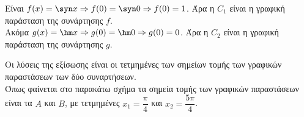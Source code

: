 \begin{alist}
\item Είναι $f(x) = \syn  x \Rightarrow f(0) = \syn  0 \Rightarrow f(0) = 1$. Άρα η $C_1$ είναι η γραφική παράσταση της συνάρτησης $f$. \\
Ακόμα $g(x) = \hm  x \Rightarrow g(0) = \hm  0 \Rightarrow g(0) = 0$. Άρα η $C_2$ είναι η γραφική παράσταση της συνάρτησης $g$.
\item Οι λύσεις της εξίσωσης είναι οι τετμημένες των σημείων τομής των γραφικών παραστάσεων των δύο συναρτήσεων. \\
Όπως φαίνεται στο παρακάτω σχήμα τα σημεία τομής των γραφικών παραστάσεων είναι τα $A$ και $B$, με τετμημένες $x_1 = \dfrac{\pi}{4}$ και $x_2 = \dfrac{5\pi}{4}$.
\end{alist}


